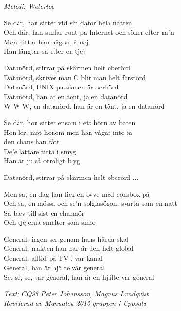 {\footnotesize\textit{Melodi: Waterloo}}\par
\vspace{10pt}
Se där, han sitter vid sin dator hela natten\\
Och där, han surfar runt på Internet och söker efter nå'n\\
Men hittar han någon, å nej\\
Han längtar så efter en tjej\par
\vspace{10pt}
Datanörd, stirrar på skärmen helt oberörd\\
Datanörd, skriver man C blir man helt förstörd\\
Datanörd, UNIX-passionen är oerhörd\\
Datanörd, han är en tönt, ja en datanörd\\
W W W, en datanörd, han är en tönt, ja en datanörd\par
\vspace{10pt}
Se där, hon sitter ensam i ett hörn av baren\\
Hon ler, mot honom men han vågar inte ta\\
den chans han fått\\
De'e lättare titta i smyg\\
Han är ju så otroligt blyg\par
\vspace{10pt}
Datanörd, stirrar på skärmen helt oberörd ...\par
\vspace{10pt}
Men så, en dag han fick en ovve med consbox på\\
Och så, en mössa och se'n solglasögon, svarta som en natt\\
Så blev till sist en charmör\\
Och tjejerna smälter som smör\par
\newpage
General, ingen ser genom hans hårda skal\\
General, makten han har är den helt global\\
General, alltid på TV i var kanal\\
General, han är hjälte vår general\\
Se, se, se, vår general, han är en hjälte vår general\par
\vspace{10pt}
{\footnotesize\textit{Text: CQ98 Peter Johansson, Magnus Lundqvist\\
Reviderad av Manualen 2015-gruppen i Uppsala}}
